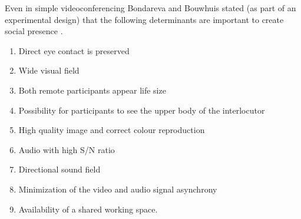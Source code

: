        Even in simple videoconferencing Bondareva and Bouwhuis stated (as part of an experimental design) that the following determinants are important to create social presence \cite{Bondareva2004, Jouppi2002}. 
            \begin{enumerate}
            \item    Direct eye contact is preserved
            \item    Wide visual field
            \item    Both remote participants appear life size
            \item    Possibility for participants to see the upper body of the interlocutor
            \item    High quality image and correct colour reproduction
            \item    Audio with high S/N ratio
            \item    Directional sound field
            \item    Minimization of the video and audio signal asynchrony
            \item    Availability of a shared working space.
            \end{enumerate}
			
